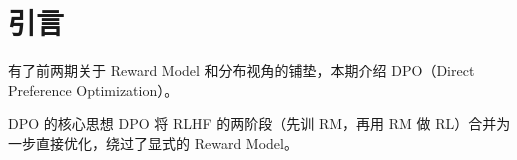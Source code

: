 \section{引言}
有了前两期关于 Reward Model 和分布视角的铺垫，本期介绍 DPO（Direct Preference Optimization）。

\begin{importantbox}{DPO 的核心思想}
DPO 将 RLHF 的两阶段（先训 RM，再用 RM 做 RL）合并为一步直接优化，绕过了显式的 Reward Model。
\end{importantbox}

